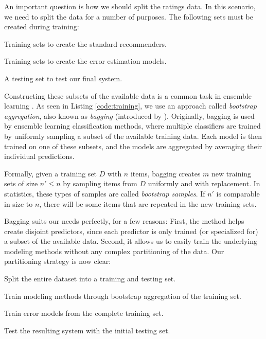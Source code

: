 An important question is how we should split the ratings data.
In this scenario, we need to split the data for a number of purposes.
The following sets must be created during training:

\begin{enumerate*}
  \item Training sets to create the standard recommenders.
  \item Training sets to create the error estimation models.
  \item A testing set to test our final system.
\end{enumerate*}

Constructing these subsets of the available data is a common task in ensemble learning
\cite[p7]{Polikar2006}.
As seen in Listing \ref{code:training}, we use an approach called 
\emph{bootstrap aggregation}, also known as \emph{bagging}
(introduced by \cite{Breiman1996}).
Originally, bagging is used by ensemble learning classification methods, where multiple classifiers are 
trained by uniformly sampling a subset of the available training data. 
Each model is then trained on one of these subsets, and the models are aggregated by averaging their individual predictions.

Formally, given a training set $D$ with $n$ items, bagging creates $m$ new training sets of size $n' \leq n$ by sampling
items from $D$ uniformly and with replacement. 
In statistics, these types of samples are called \emph{bootstrap samples}.
If $n'$ is comparable in size to $n$, there will be some items
that are repeated in the new training sets.

Bagging suits our needs perfectly, for a few reasons: First, the method helps create disjoint predictors, 
since each predictor is only trained (or specialized for) a subset of the available data.
Second, it allows us to easily train the underlying modeling methods without any complex partitioning of the data.
Our partitioning strategy is now clear:

\begin{enumerate*}
  \item Split the entire dataset into a training and testing set.
  \item Train modeling methods through bootstrap aggregation of the training set.
  \item Train error models from the complete training set.
  \item Test the resulting system with the initial testing set.
\end{enumerate*}

